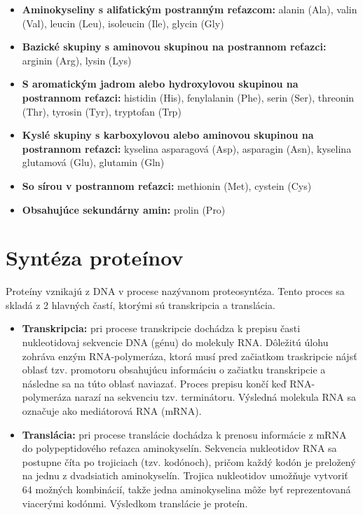 \begin{itemize}
	\item \textbf{Aminokyseliny s alifatickým postranným reťazcom:} alanin (Ala), valin (Val), leucin (Leu), isoleucin (Ile), glycin (Gly)
	\item \textbf{Bazické skupiny s aminovou skupinou na postrannom reťazci:} arginin (Arg), lysin (Lys)
	\item \textbf{S aromatickým jadrom alebo hydroxylovou skupinou na postrannom reťazci:}
	histidin (His), fenylalanin (Phe), serin (Ser), threonin (Thr), tyrosin (Tyr), tryptofan (Trp)
	\item \textbf{Kyslé skupiny s karboxylovou alebo aminovou skupinou na postrannom reťazci:} kyselina asparagová (Asp), asparagin (Asn), kyselina glutamová (Glu), glutamin (Gln)
	\item \textbf{So sírou v postrannom reťazci:} methionin (Met), cystein (Cys)
	\item \textbf{Obsahujúce sekundárny amin:} prolin (Pro)
\end{itemize}

\section{Syntéza proteínov}

Proteíny vznikajú z DNA v procese nazývanom proteosyntéza. Tento proces sa skladá z 2 hlavných častí, ktorými sú transkripcia a translácia.

\begin{itemize}

\item \textbf{Transkripcia:} pri procese transkripcie dochádza k prepisu časti nukleotidovaj sekvencie DNA (génu) do molekuly RNA. Dôležitú úlohu zohráva enzým RNA-polymeráza, ktorá musí pred začiatkom traskripcie nájsť oblasť tzv. promotoru obsahujúcu informáciu o začiatku transkripcie a následne sa na túto oblasť naviazať. Proces prepisu končí keď RNA-polymeráza narazí na sekvenciu tzv. terminátoru. Výsledná molekula RNA sa označuje ako mediátorová RNA (mRNA). 
\item \textbf{Translácia:} pri procese translácie dochádza k prenosu informácie z mRNA do polypeptidového reťazca aminokyselín. Sekvencia nukleotidov RNA sa postupne číta po trojiciach (tzv. kodónoch), pričom každý kodón je preložený na jednu z dvadsiatich aminokyselín. Trojica nukleotidov umožňuje vytvoriť 64 možných kombinácií, takže jedna aminokyselina môže byť reprezentovaná viacerými kodónmi. Výsledkom translácie je proteín.

\end{itemize}
\newpage
